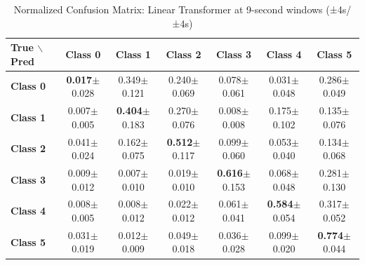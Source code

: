 \begin{table}[htbp]
\centering
\caption{Normalized Confusion Matrix: Linear Transformer at 9-second windows (±4s/±4s)}
\label{tab:app_cm_linear_9s}
\small
\setlength{\tabcolsep}{2pt}
\begin{tabular}{lcccccc}
	\toprule
	\textbf{True $\backslash$ Pred} & \textbf{Class 0} & \textbf{Class 1} & \textbf{Class 2} & \textbf{Class 3} & \textbf{Class 4} & \textbf{Class 5} \\
\midrule
	\textbf{Class 0} & \textbf{0.017}$\pm$0.028 & 0.349$\pm$0.121 & 0.240$\pm$0.069 & 0.078$\pm$0.061 & 0.031$\pm$0.048 & 0.286$\pm$0.049 \\
	\textbf{Class 1} & 0.007$\pm$0.005 & \textbf{0.404}$\pm$0.183 & 0.270$\pm$0.076 & 0.008$\pm$0.008 & 0.175$\pm$0.102 & 0.135$\pm$0.076 \\
	\textbf{Class 2} & 0.041$\pm$0.024 & 0.162$\pm$0.075 & \textbf{0.512}$\pm$0.117 & 0.099$\pm$0.060 & 0.053$\pm$0.040 & 0.134$\pm$0.068 \\
	\textbf{Class 3} & 0.009$\pm$0.012 & 0.007$\pm$0.010 & 0.019$\pm$0.010 & \textbf{0.616}$\pm$0.153 & 0.068$\pm$0.048 & 0.281$\pm$0.130 \\
	\textbf{Class 4} & 0.008$\pm$0.005 & 0.008$\pm$0.012 & 0.022$\pm$0.012 & 0.061$\pm$0.041 & \textbf{0.584}$\pm$0.054 & 0.317$\pm$0.052 \\
	\textbf{Class 5} & 0.031$\pm$0.019 & 0.012$\pm$0.009 & 0.049$\pm$0.018 & 0.036$\pm$0.028 & 0.099$\pm$0.020 & \textbf{0.774}$\pm$0.044 \\
\bottomrule
\end{tabular}
\setlength{\tabcolsep}{6pt}
\end{table}

